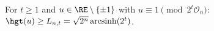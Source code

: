 For $t\ge1$ and $u\in\RE\setminus\{\pm1\}$ with $u\equiv1\pmod{2^t\mathcal O_n}$: $\hgt(u)\ge L_{n,t}=\sqrt{2^n}\operatorname{arcsinh}(2^t)$.
